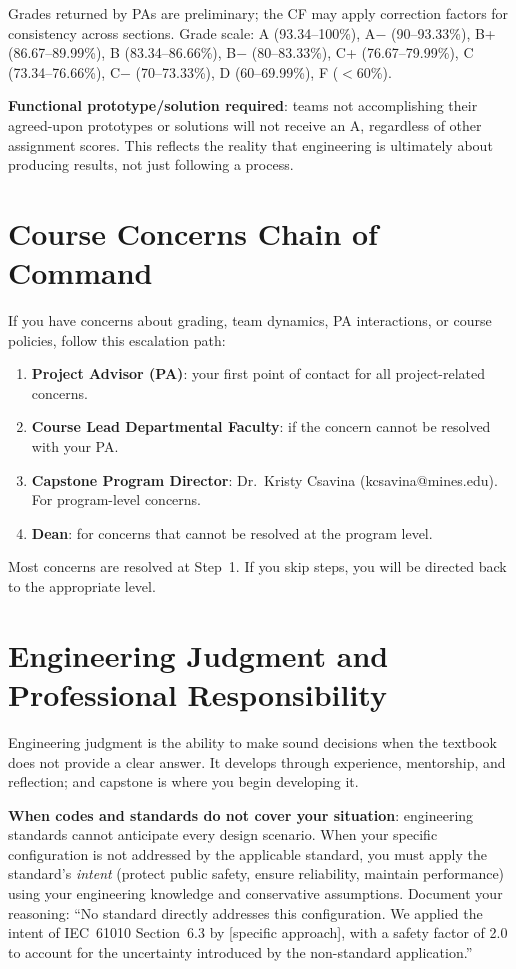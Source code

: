 Grades returned by PAs are preliminary; the CF may apply correction factors for consistency across sections. Grade scale: A (93.34--100\%), A$-$ (90--93.33\%), B+ (86.67--89.99\%), B (83.34--86.66\%), B$-$ (80--83.33\%), C+ (76.67--79.99\%), C (73.34--76.66\%), C$-$ (70--73.33\%), D (60--69.99\%), F ($<$60\%).

\textbf{Functional prototype/solution required}: teams not accomplishing their agreed-upon prototypes or solutions will not receive an A, regardless of other assignment scores. This reflects the reality that engineering is ultimately about producing results, not just following a process.

\section{Course Concerns Chain of Command}
If you have concerns about grading, team dynamics, PA interactions, or course policies, follow this escalation path:
\begin{enumerate}[nosep,leftmargin=1.5em]
\item \textbf{Project Advisor (PA)}: your first point of contact for all project-related concerns.
\item \textbf{Course Lead Departmental Faculty}: if the concern cannot be resolved with your PA.
\item \textbf{Capstone Program Director}: Dr.\ Kristy Csavina (kcsavina@mines.edu). For program-level concerns.
\item \textbf{Dean}: for concerns that cannot be resolved at the program level.
\end{enumerate}

Most concerns are resolved at Step~1. If you skip steps, you will be directed back to the appropriate level.


\section{Engineering Judgment and Professional Responsibility}
Engineering judgment is the ability to make sound decisions when the textbook does not provide a clear answer. It develops through experience, mentorship, and reflection; and capstone is where you begin developing it.

\textbf{When codes and standards do not cover your situation}: engineering standards cannot anticipate every design scenario. When your specific configuration is not addressed by the applicable standard, you must apply the standard's \emph{intent} (protect public safety, ensure reliability, maintain performance) using your engineering knowledge and conservative assumptions. Document your reasoning: ``No standard directly addresses this configuration. We applied the intent of IEC~61010 Section~6.3 by [specific approach], with a safety factor of 2.0 to account for the uncertainty introduced by the non-standard application.''

